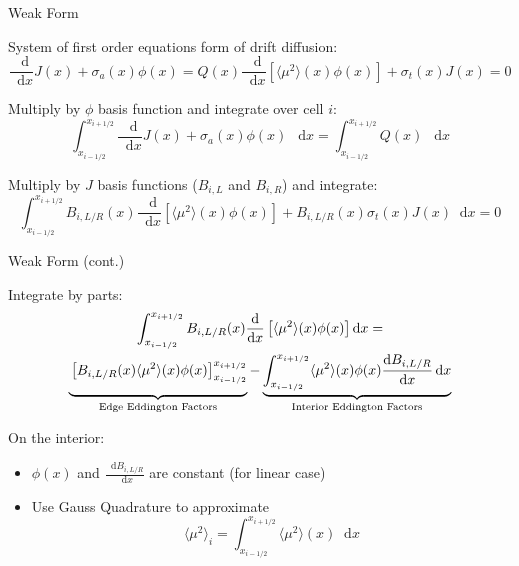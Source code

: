 \documentclass[10pt]{beamer}
\newcommand{\ud}{\mathop{}\!\mathrm{d}} %
\newcommand{\dderiv}[2]{\frac{\ud #1}{\ud #2}}
\newcommand{\edd}{\langle \mu^2 \rangle}
\newcommand{\bracket}[1]{\left[ #1 \right]}
\begin{document}
\begin{frame}{Weak Form}

	System of first order equations form of drift diffusion:
	\begin{subequations} 
	\begin{equation*} \label{eq:zero}
		\dderiv{}{x} J (x) + \sigma_a(x) \phi(x) = Q(x)
	\end{equation*} 
	\begin{equation*} \label{eq:first}
		\dderiv{}{x} \bracket{\edd(x) \phi (x)} + \sigma_t(x) J(x) = 0
	\end{equation*}
	\end{subequations}

	\pause
	Multiply by $\phi$ basis function and integrate over cell $i$: 
	\begin{equation*}
		\int_{x_{i-1/2}}^{x_{i+1/2}} \dderiv{}{x} J (x) + \sigma_a(x) \phi(x) \ \ud x 
		= \int_{x_{i-1/2}}^{x_{i+1/2}} Q(x) \ \ud x
	\end{equation*}

	\pause
	Multiply by $J$ basis functions ($B_{i,L}$ and $B_{i,R}$) and integrate: 
	\begin{equation*}
		\int_{x_{i-1/2}}^{x_{i+1/2}} 
		B_{i,L/R}(x)\dderiv{}{x} \bracket{\edd(x) \phi (x)} + B_{i,L/R}(x)\sigma_t(x) J(x) \ud x = 0
	\end{equation*}

	

\end{frame}

\begin{frame}{Weak Form (cont.)}

	Integrate by parts:
	\begin{multline*}
		\int_{x_{i-1/2}}^{x_{i+1/2}} 
			B_{i,L/R}(x)\dderiv{}{x} \bracket{\edd(x) \phi (x)} \ud x = \\ 
		\underbrace{\vphantom{\int_{x_{i-1/2}}}
		\bracket{B_{i,L/R}(x)\edd(x)\phi(x)}_{x_{i-1/2}}^{x_{i+1/2}}}_\text{Edge Eddington Factors}
		- 
		\underbrace{\int_{x_{i-1/2}}^{x_{i+1/2}}
		\edd(x) \phi(x) \dderiv{B_{i,L/R}}{x} \ud x}_\text{Interior Eddington Factors}
	\end{multline*}

	\pause
	On the interior: 
	\begin{itemize}

		\item $\phi(x)$ and $\dderiv{B_{i,L/R}}{x}$ are constant (for linear case)

		\item Use Gauss Quadrature to approximate 
		\begin{equation*}
			\edd_i = \int_{x_{i-1/2}}^{x_{i+1/2}} \edd(x) \ud x 
		\end{equation*}

	\end{itemize}

\end{frame}
\end{document}

